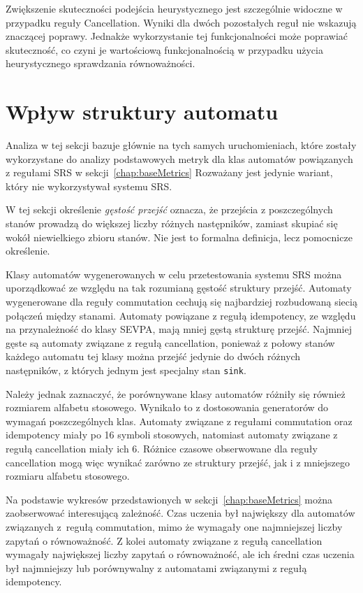 Zwiększenie skuteczności podejścia heurystycznego jest szczególnie widoczne w przypadku reguły Cancellation.
Wyniki dla dwóch pozostałych reguł nie wskazują znaczącej poprawy. Jednakże wykorzystanie tej funkcjonalności może
poprawiać skuteczność, co czyni je wartościową funkcjonalnością w przypadku użycia heurystycznego sprawdzania
równoważności.

\section{Wpływ struktury automatu}

Analiza w tej sekcji bazuje głównie na tych samych uruchomieniach, które zostały wykorzystane do analizy podstawowych metryk
dla klas automatów powiązanych z regułami SRS w sekcji~\ref{chap:baseMetrics} Rozważany jest jedynie wariant,
który nie wykorzystywał systemu SRS.

W tej sekcji określenie \emph{gęstość przejść} oznacza,
że przejścia z poszczególnych stanów prowadzą do większej liczby różnych następników,
zamiast skupiać się wokół niewielkiego zbioru stanów. Nie jest to
formalna definicja, lecz pomocnicze określenie.

Klasy automatów wygenerowanych w celu przetestowania systemu SRS można uporządkować ze względu na tak
rozumianą gęstość struktury przejść. Automaty wygenerowane dla reguły commutation cechują się
najbardziej rozbudowaną siecią połączeń między stanami. Automaty powiązane z regułą idempotency,
ze względu na przynależność do klasy SEVPA, mają mniej gęstą strukturę przejść.
Najmniej gęste są automaty związane z regułą cancellation, ponieważ z połowy stanów
każdego automatu tej klasy można przejść jedynie do dwóch różnych następników,
z których jednym jest specjalny stan \texttt{sink}.

Należy jednak zaznaczyć, że porównywane klasy automatów różniły się również
rozmiarem alfabetu stosowego. Wynikało to z dostosowania generatorów do wymagań
poszczególnych klas. Automaty związane z regułami commutation oraz idempotency
miały po 16 symboli stosowych, natomiast automaty związane z regułą cancellation
miały ich 6. Różnice czasowe obserwowane dla reguły cancellation mogą więc wynikać
zarówno ze struktury przejść, jak i z mniejszego rozmiaru alfabetu stosowego.

Na podstawie wykresów przedstawionych w sekcji~\ref{chap:baseMetrics} można zaobserwować interesującą zależność.
Czas uczenia był największy dla automatów związanych z~regułą commutation, mimo że wymagały one najmniejszej liczby
zapytań o równoważność. Z kolei automaty związane z regułą cancellation wymagały największej liczby zapytań
o równoważność, ale ich średni czas uczenia był najmniejszy lub porównywalny z automatami związanymi z regułą idempotency.

